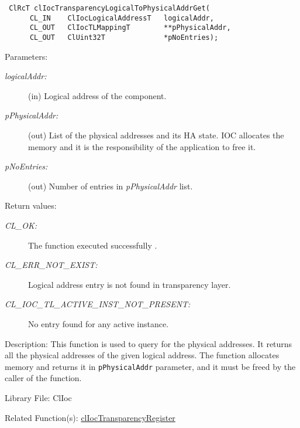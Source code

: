 \begin{flushleft}
\begin{Desc}
\footnotesize\begin{verbatim} ClRcT clIocTransparencyLogicalToPhysicalAddrGet(
      CL_IN    ClIocLogicalAddressT   logicalAddr,
      CL_OUT   ClIocTLMappingT        **pPhysicalAddr,
      CL_OUT   ClUint32T              *pNoEntries);
\end{verbatim}
\normalsize
\end{Desc}
\begin{Desc}
\item[Parameters:]
\begin{description}
\item[{\em logical\-Addr:}](in) Logical address of the component. \item[{\em p\-Physical\-Addr:}](out) List of the physical addresses and its HA state. 
IOC allocates the memory and it is the responsibility of the application to free it. 
\item[{\em p\-No\-Entries:}](out) Number of entries in {\em p\-Physical\-Addr}
list.\end{description}
\end{Desc}
\begin{Desc}
\item[Return values:]
\begin{description}
\item[{\em CL\_\-OK:}]The function executed successfully . 
\item[{\em CL\_\-ERR\_\-NOT\_\-EXIST:}]Logical address entry is not found in transparency layer.
\item[{\em CL\_\-IOC\_\-TL\_\-ACTIVE\_\-INST\_\-NOT\_\-PRESENT:}]No entry found for any active instance.\end{description}
\end{Desc}
\begin{Desc}
\item[Description:]This function is used to query for the physical addresses. It returns all the physical addresses of the given logical address. The 
function allocates memory and returns it in {\tt{p\-Physical\-Addr}} parameter, and it must be freed by the caller of the function.\end{Desc}
\begin{Desc}
\item[Library File:]Cl\-Ioc\end{Desc}
\begin{Desc}
\item[Related Function(s):]\hyperlink{pageioc118}{cl\-Ioc\-Transparency\-Register} \end{Desc}
\newpage



\end{flushleft}
